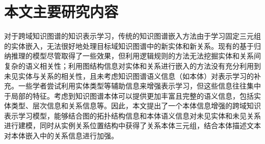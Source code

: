 


\section{本文主要研究内容}
对于跨域知识图谱的知识表示学习，传统的知识图谱嵌入方法由于学习固定三元组的实体嵌入，无法很好地处理目标域知识图谱中的新实体和新关系。现有的基于归纳推理的模型尽管取得了一些效果，但利用逻辑规则的方法无法挖掘实体和关系间复杂的语义相关性；利用图结构信息对实体和关系进行嵌入的方法没有充分利用到未见实体与关系的相关性，且未考虑知识图谱语义信息（如本体）对表示学习的补充。一些学者尝试利用实体类型等辅助信息来增强表示学习，但这些信息往往集中于局部的特征。考虑到知识图谱本体可以提供更加丰富且完整的语义信息，包括实体类型、层次信息和关系信息等。因此，本文提出了一个本体信息增强的跨域知识表示学习模型，能够结合图的拓扑结构信息和本体语义信息对未见实体和未见关系进行建模，同时从实例关系位置结构中获得了关系本体三元组，结合本体描述文本对本体嵌入中的关系信息进行加强。

